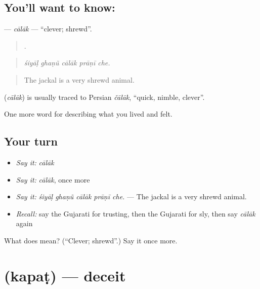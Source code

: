 \subsection*{You'll want to know: }
\textbf{} — \emph{cālāk} — \textquotedblleft{}clever; shrewd\textquotedblright{}.

\begin{quote}
    .
\end{quote}

\begin{quote}
\emph{śiyāḷ ghaṇũ cālāk prāṇī che.}
\end{quote}

\begin{quote}
The jackal is a very shrewd animal.
\end{quote}

\begin{cousinweb}
\textbf{} (\emph{cālāk}) is usually traced to Persian \emph{čālāk}, \textquotedblleft{}quick, nimble, clever\textquotedblright{}.
\end{cousinweb}

\begin{grammarlens}[title={What you've built}]
One more word for describing what you lived and felt.
\end{grammarlens}

\subsection*{Your turn}
\begin{itemize}
\raggedright
  \item \emph{Say it:} \emph{cālāk}
  \item \emph{Say it:} \emph{cālāk}, once more
  \item \emph{Say it:} \emph{śiyāḷ ghaṇũ cālāk prāṇī che.} — The jackal is a very shrewd animal.
  \item \emph{Recall:} say the Gujarati for trusting, then the Gujarati for sly, then say \emph{cālāk} again
\end{itemize}

\begin{tcolorbox}[breakable,colback=teal!4,colframe=teal!35!black,title={Before you move on}]
What does  mean? (\textquotedblleft{}Clever; shrewd\textquotedblright{}.) Say it once more.
\end{tcolorbox}
\section[\texorpdfstring{\gu{કપટ} (kapaṭ)}{કપટ (kapaṭ)}]{ (kapaṭ) — deceit}

